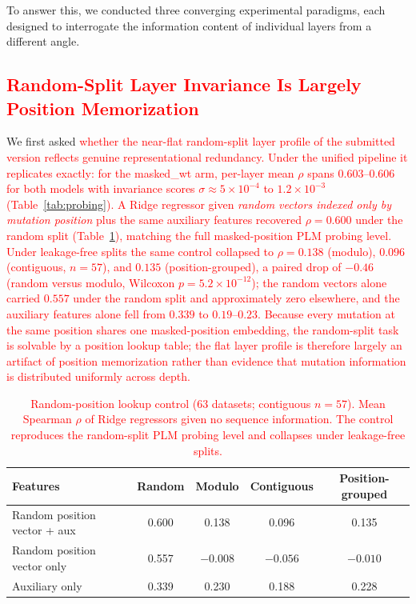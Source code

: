 \documentclass[11pt,a4paper]{article}
\newcommand{\revised}[1]{\textcolor{red}{#1}}
\begin{document}
To answer this, we conducted three converging experimental paradigms, each designed to
interrogate the information content of individual layers from a different angle.

\subsection{\revised{Random-Split Layer Invariance Is Largely Position Memorization}}

We first asked \revised{whether the near-flat random-split layer profile of the submitted
version reflects genuine representational redundancy. Under the unified pipeline it
replicates exactly: for the masked\_wt arm, per-layer mean $\rho$ spans
$0.603$--$0.606$ for both models with invariance scores $\sigma \approx 5 \times
10^{-4}$ to $1.2 \times 10^{-3}$ (Table~\ref{tab:probing}). A Ridge regressor given
\emph{random vectors indexed only by mutation position} plus the same auxiliary
features recovered $\rho = 0.600$ under the random split (Table~\ref{tab:control}),
matching the full masked-position PLM probing level. Under leakage-free splits the
same control collapsed to $\rho = 0.138$ (modulo), $0.096$ (contiguous, $n=57$), and
$0.135$ (position-grouped), a paired drop of $-0.46$ (random versus modulo, Wilcoxon
$p = 5.2 \times 10^{-12}$); the random vectors alone carried $0.557$ under the random
split and approximately zero elsewhere, and the auxiliary features alone fell from
$0.339$ to $0.19$--$0.23$. Because every mutation at the same position shares one
masked-position embedding, the random-split task is solvable by a position lookup
table; the flat layer profile is therefore largely an artifact of position
memorization rather than evidence that mutation information is distributed uniformly
across depth.}

\begin{table}[ht]
\centering
\caption{\revised{Random-position lookup control (63 datasets; contiguous $n = 57$).
Mean Spearman $\rho$ of Ridge regressors given no sequence information. The control
reproduces the random-split PLM probing level and collapses under leakage-free
splits.}}
\label{tab:control}
\begin{tabular}{lcccc}
\toprule
Features & Random & Modulo & Contiguous & Position-grouped \\
\midrule
Random position vector + aux & 0.600 & 0.138 & 0.096 & 0.135 \\
Random position vector only  & 0.557 & $-0.008$ & $-0.056$ & $-0.010$ \\
Auxiliary only               & 0.339 & 0.230 & 0.188 & 0.228 \\
\bottomrule
\end{tabular}
\end{table}
\end{document}
